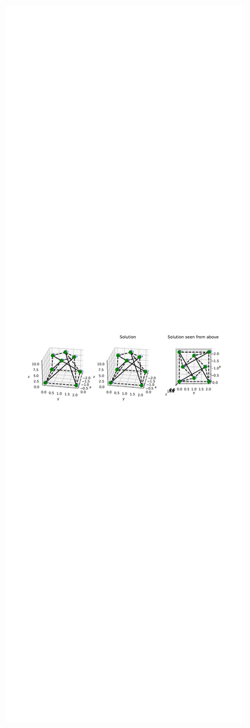 \begin{figure}[!ht]
\centering
\begin{subfigure}{.72\textwidth}
  \centering
  \includegraphics[width=0.99\linewidth]{Bilder/FREESTANDING.pdf}

\end{subfigure}
\end{figure}
